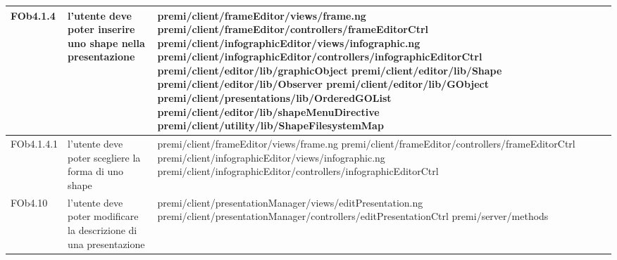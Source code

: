 \begin{longtable}{|l|p{5cm}|p{7cm}|}
FOb4.1.4 & l'utente deve poter inserire uno shape nella presentazione & \hspace{0pt}premi/client/frameEditor/views/frame.ng \linebreak \linebreak premi/client/frameEditor/controllers/frameEditorCtrl \linebreak \linebreak premi/client/infographicEditor/views/infographic.ng \linebreak \linebreak premi/client/infographicEditor/controllers/infographicEditorCtrl \linebreak \linebreak premi/client/editor/lib/graphicObject \linebreak \linebreak premi/client/editor/lib/Shape  \linebreak \linebreak \linebreak \linebreak premi/client/editor/lib/Observer premi/client/editor/lib/GObject \linebreak \linebreak premi/client/presentations/lib/OrderedGOList \linebreak \linebreak premi/client/editor/lib/shapeMenuDirective \linebreak \linebreak premi/client/utility/lib/ShapeFilesystemMap \\
\hline
FOb4.1.4.1 & l'utente deve poter scegliere la forma di uno shape & \hspace{0pt}premi/client/frameEditor/views/frame.ng \linebreak \linebreak premi/client/frameEditor/controllers/frameEditorCtrl \linebreak \linebreak premi/client/infographicEditor/views/infographic.ng \linebreak \linebreak premi/client/infographicEditor/controllers/infographicEditorCtrl \\
\hline
FOb4.10 & l'utente deve poter modificare la descrizione di una presentazione &\hspace{0pt}premi/client/presentationManager/views/editPresentation.ng \linebreak \linebreak premi/client/presentationManager/controllers/editPresentationCtrl  \linebreak \linebreak premi/server/methods \\

\end{longtable}
